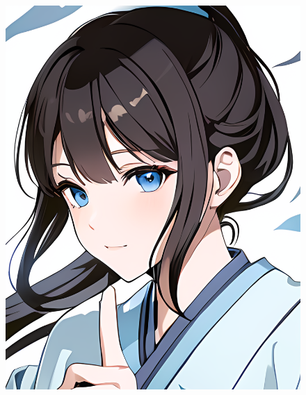 \documentclass[10pt]{article}
\begin{document}
\begin{figure}[h]
\begin{minipage}{0.80\textwidth}
\begin{tabularx}{\linewidth}{p{}Xp{}X}
            \end{tabularx}
        \end{minipage}
        \begin{minipage}{0.16\textwidth}
            \includegraphics[width=\linewidth]{images/example_avatar.png}
        \end{minipage}
    \end{figure}
\vspace{-1em}
\end{document}
